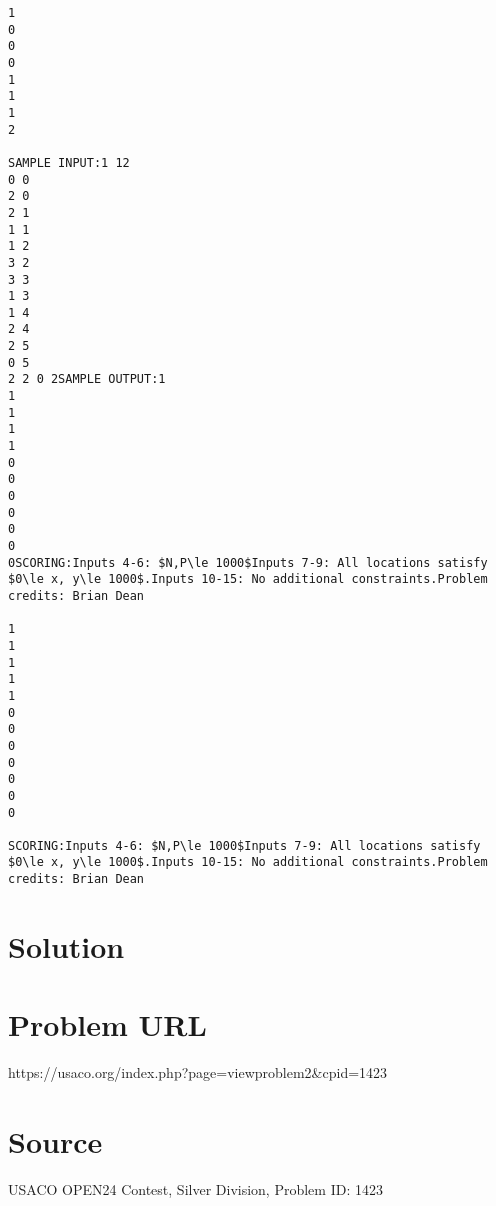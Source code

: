 \documentclass[12pt]{article}
\begin{document}
\begin{verbatim}
1
0
0
0
1
1
1
2

SAMPLE INPUT:1 12
0 0
2 0
2 1
1 1
1 2
3 2
3 3
1 3
1 4
2 4
2 5
0 5
2 2 0 2SAMPLE OUTPUT:1
1
1
1
1
0
0
0
0
0
0
0SCORING:Inputs 4-6: $N,P\le 1000$Inputs 7-9: All locations satisfy $0\le x, y\le 1000$.Inputs 10-15: No additional constraints.Problem credits: Brian Dean

1
1
1
1
1
0
0
0
0
0
0
0

SCORING:Inputs 4-6: $N,P\le 1000$Inputs 7-9: All locations satisfy $0\le x, y\le 1000$.Inputs 10-15: No additional constraints.Problem credits: Brian Dean
\end{verbatim}

\section*{Solution}


\section*{Problem URL}
https://usaco.org/index.php?page=viewproblem2&cpid=1423

\section*{Source}
USACO OPEN24 Contest, Silver Division, Problem ID: 1423
\end{document}
